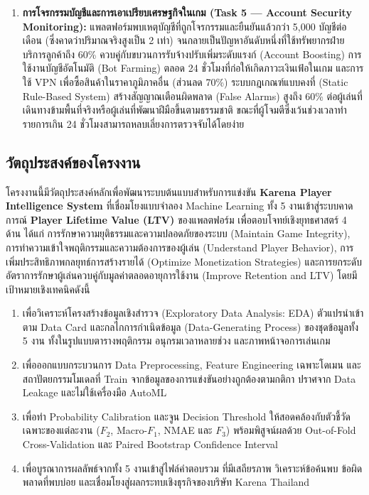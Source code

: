 \documentclass[11pt,a4paper]{article}
\DeclareRobustCommand{\code}[1]{\leavevmode{\ttfamily\color{KeyGreen!85!black}\let\codeunderscore\_\def\_{\codeunderscore\allowbreak}\hyphenpenalty=50\exhyphenpenalty=50\relax#1}}
\begin{document}
\begin{enumerate}[leftmargin=1.9em,itemsep=2.5pt]
    \item \textbf{การโจรกรรมบัญชีและการเอาเปรียบเศรษฐกิจในเกม (Task 5 — Account Security Monitoring):} แพลตฟอร์มพบเหตุบัญชีที่ถูกโจรกรรมและยืนยันแล้วกว่า 5,000 บัญชีต่อเดือน (ซึ่งคาดว่าปริมาณจริงสูงเป็น 2 เท่า) จนกลายเป็นปัญหาอันดับหนึ่งที่ใช้ทรัพยากรฝ่ายบริการลูกค้าถึง 60\% ควบคู่กับขบวนการรับจ้างปรับเพิ่มระดับแรงก์ (Account Boosting) การใช้งานบัญชีอัตโนมัติ (Bot Farming) ตลอด 24 ชั่วโมงที่ก่อให้เกิดภาวะเงินเฟ้อในเกม และการใช้ VPN เพื่อซื้อสินค้าในราคาภูมิภาคอื่น (ส่วนลด 70\%) ระบบกฎเกณฑ์แบบคงที่ (Static Rule-Based System) สร้างสัญญาณเตือนผิดพลาด (False Alarms) สูงถึง 60\% ต่อผู้เล่นที่เดินทางข้ามพื้นที่จริงหรือผู้เล่นที่พัฒนาฝีมือขึ้นตามธรรมชาติ ขณะที่ผู้โจมตีซึ่งเว้นช่วงเวลาทำรายการเกิน 24 ชั่วโมงสามารถหลบเลี่ยงการตรวจจับได้โดยง่าย
\end{enumerate}

\subsection{วัตถุประสงค์ของโครงงาน}

โครงงานนี้มีวัตถุประสงค์หลักเพื่อพัฒนาระบบต้นแบบสำหรับการแข่งขัน \textbf{Karena Player Intelligence System} ที่เชื่อมโยงแบบจำลอง Machine Learning ทั้ง 5 งานเข้าสู่ระบบคาดการณ์ \textbf{Player Lifetime Value (LTV)} ของแพลตฟอร์ม เพื่อตอบโจทย์เชิงยุทธศาสตร์ 4 ด้าน ได้แก่ การรักษาความยุติธรรมและความปลอดภัยของระบบ (Maintain Game Integrity), การทำความเข้าใจพฤติกรรมและความต้องการของผู้เล่น (Understand Player Behavior), การเพิ่มประสิทธิภาพกลยุทธ์การสร้างรายได้ (Optimize Monetization Strategies) และการยกระดับอัตราการรักษาผู้เล่นควบคู่กับมูลค่าตลอดอายุการใช้งาน (Improve Retention and LTV) โดยมีเป้าหมายเชิงเทคนิคดังนี้

\begin{enumerate}[leftmargin=1.8em,itemsep=2pt]
    \item เพื่อวิเคราะห์โครงสร้างข้อมูลเชิงสำรวจ (Exploratory Data Analysis: EDA) ตัวแปรนำเข้าตาม Data Card และกลไกการกำเนิดข้อมูล (Data-Generating Process) ของชุดข้อมูลทั้ง 5 งาน ทั้งในรูปแบบตารางพฤติกรรม อนุกรมเวลาหลายช่วง และภาพหน้าจอการเล่นเกม
    \item เพื่อออกแบบกระบวนการ Data Preprocessing, Feature Engineering เฉพาะโดเมน และสถาปัตยกรรมโมเดลที่ Train จากข้อมูลของการแข่งขันอย่างถูกต้องตามกติกา ปราศจาก Data Leakage และไม่ใช้เครื่องมือ AutoML
    \item เพื่อทำ Probability Calibration และจูน Decision Threshold ให้สอดคล้องกับตัวชี้วัดเฉพาะของแต่ละงาน ($F_2$, Macro-$F_1$, NMAE และ $F_3$) พร้อมพิสูจน์ผลด้วย Out-of-Fold Cross-Validation และ Paired Bootstrap Confidence Interval
    \item เพื่อบูรณาการผลลัพธ์จากทั้ง 5 งานเข้าสู่ไฟล์คำตอบรวม \code{submission.csv} ที่มีเสถียรภาพ วิเคราะห์ข้อค้นพบ ข้อผิดพลาดที่พบบ่อย และเชื่อมโยงสู่ผลกระทบเชิงธุรกิจของบริษัท Karena Thailand
\end{enumerate}
\end{document}
